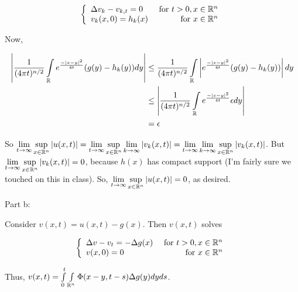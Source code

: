 \documentclass[a4paper,12pt]{article}
\begin{document}
\begin{displaymath}
   \left\{
     \begin{array}{lr}
       \Delta v_k -v_{k,t}  = 0 & \text{ for } t>0, x \in \mathbb{R}^n \\
       v_k(x,0) = h_k(x) & \text{ for } x \in \mathbb{R}^n
     \end{array}
   \right.
\end{displaymath}


Now,  %

\begin{align*}
\left\lvert \frac{1}{(4\pi t)^{n/2}}\int\limits_{\mathbb{R}} e^{\frac{-\left\lvert x-y \right\rvert^2}{4t}} (g(y) -h_k(y)) dy \right\rvert &\leq \frac{1}{(4\pi t)^{n/2}}\int\limits_{\mathbb{R}} \left\lvert e^{\frac{-\left\lvert x-y \right\rvert^2}{4t}} (g(y) -h_k(y)) \right\rvert dy\\
&\leq \left\lvert  \frac{1}{(4\pi t)^{n/2}}\int\limits_{\mathbb{R}} e^{\frac{-\left\lvert x-y \right\rvert^2}{4t}} \epsilon dy \right\rvert\\
&= \epsilon
\end{align*}

So $\lim\limits_{t \to \infty} \sup\limits_{x \in \mathbb{R}^n} \left\lvert u(x,t) \right\rvert = \lim\limits_{t \to \infty} \sup\limits_{x \in \mathbb{R}^n} \lim\limits_{k \to \infty} \left\lvert v_k(x,t) \right\rvert = \lim\limits_{t \to \infty} \lim\limits_{k \to \infty} \sup\limits_{x \in \mathbb{R}^n} \left\lvert v_k(x,t) \right\rvert$. But $\lim\limits_{t \to \infty} \sup\limits_{x \in \mathbb{R}^n} \left\lvert v_k(x,t) \right\rvert = 0$, because $h(x)$ has compact support (I'm fairly sure we touched on this in class). So, $\lim\limits_{t \to \infty} \sup\limits_{x \in \mathbb{R}^n} \left\lvert u(x,t) \right\rvert = 0$, as desired.

\shunt

Part b: 

Consider $v(x,t) = u(x,t) - g(x)$. Then $v(x,t)$ solves

\begin{displaymath}
   \left\{
     \begin{array}{lr}
       \Delta v -v_t  = -\Delta g(x) & \text{ for } t>0, x \in \mathbb{R}^n \\
       v(x,0) = 0 & \text{ for } x \in \mathbb{R}^n
     \end{array}
   \right.
\end{displaymath}

Thus, $v(x,t) = \int\limits_0^t \int\limits_{\mathbb{R}^n} \Phi(x-y,t-s) \Delta g(y) dy ds$.
\end{document}
